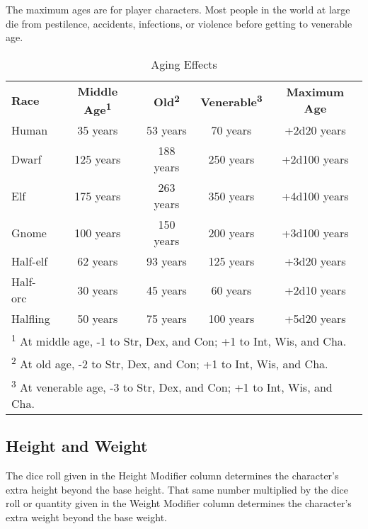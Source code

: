 The maximum ages are for player characters. Most people in the world at large die 
from pestilence, accidents, infections, or violence before getting to venerable 
age.

\begin{table}[htb]
\caption{Aging Effects}
\centering
\begin{tabular}{l c c c c}
\textbf{Race} & \textbf{Middle Age\textsuperscript{1}} & \textbf{Old\textsuperscript{2}} & \textbf{Venerable\textsuperscript{3}} & \textbf{Maximum Age}\\
Human & 35 years & 53 years & 70 years & +2d20 years\\
Dwarf & 125 years & 188 years & 250 years & +2d100 years\\
Elf & 175 years & 263 years & 350 years & +4d100 years\\
Gnome & 100 years & 150 years & 200 years & +3d100 years\\
Half-elf & 62 years & 93 years & 125 years & +3d20 years\\
Half-orc & 30 years & 45 years & 60 years & +2d10 years\\
Halfling & 50 years & 75 years & 100 years & +5d20 years\\
\multicolumn{5}{l}{\textsuperscript{1} At middle age, -1 to Str, Dex, and Con; +1 to Int, Wis, and Cha.}\\
\multicolumn{5}{l}{\textsuperscript{2} At old age, -2 to Str, Dex, and Con; +1 to Int, Wis, and Cha.}\\
\multicolumn{5}{l}{\textsuperscript{3} At venerable age, -3 to Str, Dex, and Con; +1 to Int, Wis, and Cha.}\\
\end{tabular}
\end{table}

\subsection{Height and Weight}

The dice roll given in the Height Modifier column determines the character's extra 
height beyond the base height. That same number multiplied by the dice roll or 
quantity given in the Weight Modifier column determines the character's extra weight 
beyond the base weight.


